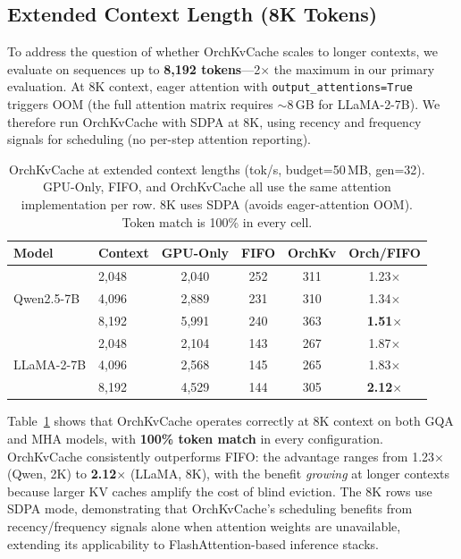 \documentclass[conference]{IEEEtran}
\begin{document}
\subsection{Extended Context Length (8K Tokens)}
\label{sec:scale}

To address the question of whether OrchKvCache scales to longer contexts, we evaluate on sequences up to \textbf{8{,}192 tokens}---2$\times$ the maximum in our primary evaluation. At 8K context, eager attention with \texttt{output\_attentions=True} triggers OOM (the full attention matrix requires ${\sim}$8\,GB for LLaMA-2-7B). We therefore run OrchKvCache with SDPA at 8K, using recency and frequency signals for scheduling (no per-step attention reporting).

\begin{table}[t]
\centering
\caption{OrchKvCache at extended context lengths (tok/s, budget=50\,MB, gen=32). GPU-Only, FIFO, and OrchKvCache all use the same attention implementation per row. 8K uses SDPA (avoids eager-attention OOM). Token match is 100\% in every cell.}
\label{tab:scale}
\small
\begin{tabular}{@{}llcccc@{}}
\toprule
Model & Context & GPU-Only & FIFO & OrchKv & Orch/FIFO \\
\midrule
\multirow{3}{*}{Qwen2.5-7B}
  & 2{,}048  & 2{,}040 & 252  & 311  & 1.23$\times$ \\
  & 4{,}096  & 2{,}889 & 231  & 310  & 1.34$\times$ \\
  & 8{,}192  & 5{,}991 & 240  & 363  & \textbf{1.51$\times$} \\
\midrule
\multirow{3}{*}{LLaMA-2-7B}
  & 2{,}048  & 2{,}104 & 143  & 267  & 1.87$\times$ \\
  & 4{,}096  & 2{,}568 & 145  & 265  & 1.83$\times$ \\
  & 8{,}192  & 4{,}529 & 144  & 305  & \textbf{2.12$\times$} \\
\bottomrule
\end{tabular}
\end{table}

Table~\ref{tab:scale} shows that OrchKvCache operates correctly at 8K context on both GQA and MHA models, with \textbf{100\% token match} in every configuration.  OrchKvCache consistently outperforms FIFO: the advantage ranges from 1.23$\times$ (Qwen, 2K) to \textbf{2.12$\times$} (LLaMA, 8K), with the benefit \emph{growing} at longer contexts because larger KV caches amplify the cost of blind eviction.  The 8K rows use SDPA mode, demonstrating that OrchKvCache's scheduling benefits from recency/frequency signals alone when attention weights are unavailable, extending its applicability to FlashAttention-based inference stacks.
\end{document}
